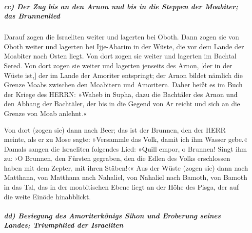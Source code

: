 \hypertarget{cc-der-zug-bis-an-den-arnon-und-bis-in-die-steppen-der-moabiter-das-brunnenlied}{%
\subparagraph{cc) Der Zug bis an den Arnon und bis in die Steppen der
Moabiter; das
Brunnenlied}\label{cc-der-zug-bis-an-den-arnon-und-bis-in-die-steppen-der-moabiter-das-brunnenlied}}

Darauf zogen die Israeliten weiter und lagerten bei
Oboth. Dann zogen sie von Oboth weiter und lagerten bei
Ijje-Abarim in der Wüste, die vor dem Lande der Moabiter nach Osten
liegt. Von dort zogen sie weiter und lagerten im Bachtal
Sered. Von dort zogen sie weiter und lagerten jenseits
des Arnon, {[}der in der Wüste ist,{]} der im Lande der Amoriter
entspringt; der Arnon bildet nämlich die Grenze Moabs zwischen den
Moabitern und Amoritern. Daher heißt es im Buch der
Kriege des HERRN: »Waheb in Supha, dazu die Bachtäler des Arnon
und den Abhang der Bachtäler, der bis in die Gegend von
Ar reicht und sich an die Grenze von Moab anlehnt.«

Von dort (zogen sie) dann nach Beer; das ist der Brunnen,
den der HERR meinte, als er zu Mose sagte: »Versammle das Volk, damit
ich ihm Wasser gebe.« Damals sangen die Israeliten
folgendes Lied: »Quill empor, o Brunnen! Singt ihm zu: ›O
Brunnen, den Fürsten gegraben, den die Edlen des Volks erschlossen haben
mit dem Zepter, mit ihren Stäben!‹« Aus der Wüste (zogen sie) dann nach
Matthana, von Matthana nach Nahaliel, von Nahaliel nach
Bamoth, von Bamoth in das Tal, das in der moabitischen
Ebene liegt an der Höhe des Pisga, der auf die weite Einöde hinabblickt.

\hypertarget{dd-besiegung-des-amoriterkuxf6nigs-sihon-und-eroberung-seines-landes-triumphlied-der-israeliten}{%
\subparagraph{dd) Besiegung des Amoriterkönigs Sihon und Eroberung
seines Landes; Triumphlied der
Israeliten}\label{dd-besiegung-des-amoriterkuxf6nigs-sihon-und-eroberung-seines-landes-triumphlied-der-israeliten}}


